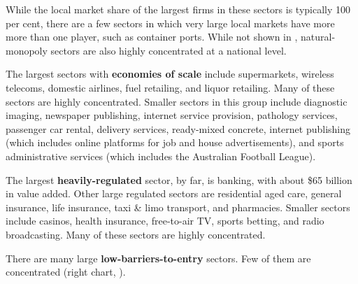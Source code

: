 While the local market share of the largest firms in these sectors is typically 100 per cent, there are a few sectors in which very large local markets have more more than one player, such as container ports. While not shown in , natural-monopoly sectors are also highly concentrated at a national level.

The largest sectors with \textbf{economies of scale} include supermarkets, wireless telecoms, domestic airlines, fuel retailing, and liquor retailing. Many of these sectors are highly concentrated. Smaller sectors in this group include diagnostic imaging, newspaper publishing, internet service provision, pathology services,  passenger car rental, delivery services, ready-mixed concrete, internet publishing (which includes online platforms for job and house advertisements), and sports administrative services (which includes the Australian Football League).




The largest \textbf{heavily-regulated} sector, by far, is banking, with about \$65 billion in value added. Other large regulated sectors are residential aged care, general insurance, life insurance, taxi \& limo transport, and pharmacies. Smaller sectors include casinos, health insurance, free-to-air TV, sports betting, and radio broadcasting. Many of these sectors are highly concentrated.

There are many large \textbf{low-barriers-to-entry} sectors. Few of them are concentrated (right chart, ).

